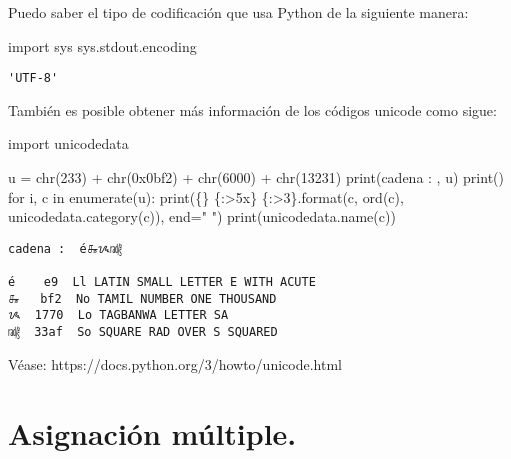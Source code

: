 \documentclass[
  letterpaper,
  DIV=11,
  numbers=noendperiod]{scrreprt}
\newenvironment{Shaded}{\begin{snugshade}}{\end{snugshade}}
\newcommand{\BaseNTok}[1]{\textcolor[rgb]{0.68,0.00,0.00}{#1}}
\newcommand{\BuiltInTok}[1]{\textcolor[rgb]{0.00,0.23,0.31}{#1}}
\newcommand{\ControlFlowTok}[1]{\textcolor[rgb]{0.00,0.23,0.31}{#1}}
\newcommand{\DecValTok}[1]{\textcolor[rgb]{0.68,0.00,0.00}{#1}}
\newcommand{\ImportTok}[1]{\textcolor[rgb]{0.00,0.46,0.62}{#1}}
\newcommand{\KeywordTok}[1]{\textcolor[rgb]{0.00,0.23,0.31}{#1}}
\newcommand{\NormalTok}[1]{\textcolor[rgb]{0.00,0.23,0.31}{#1}}
\newcommand{\OperatorTok}[1]{\textcolor[rgb]{0.37,0.37,0.37}{#1}}
\newcommand{\SpecialCharTok}[1]{\textcolor[rgb]{0.37,0.37,0.37}{#1}}
\newcommand{\StringTok}[1]{\textcolor[rgb]{0.13,0.47,0.30}{#1}}
\begin{document}
Puedo saber el tipo de codificación que usa Python de la siguiente
manera:

\begin{Shaded}
\begin{Highlighting}[]
\ImportTok{import}\NormalTok{ sys}
\NormalTok{sys.stdout.encoding}
\end{Highlighting}
\end{Shaded}

\begin{verbatim}
'UTF-8'
\end{verbatim}

También es posible obtener más información de los códigos unicode como
sigue:

\begin{Shaded}
\begin{Highlighting}[]
\ImportTok{import}\NormalTok{ unicodedata}

\NormalTok{u }\OperatorTok{=} \BuiltInTok{chr}\NormalTok{(}\DecValTok{233}\NormalTok{) }\OperatorTok{+} \BuiltInTok{chr}\NormalTok{(}\BaseNTok{0x0bf2}\NormalTok{) }\OperatorTok{+} \BuiltInTok{chr}\NormalTok{(}\DecValTok{6000}\NormalTok{) }\OperatorTok{+} \BuiltInTok{chr}\NormalTok{(}\DecValTok{13231}\NormalTok{) }
\BuiltInTok{print}\NormalTok{(}\StringTok{\textquotesingle{}cadena : \textquotesingle{}}\NormalTok{, u)}
\BuiltInTok{print}\NormalTok{()}
\ControlFlowTok{for}\NormalTok{ i, c }\KeywordTok{in} \BuiltInTok{enumerate}\NormalTok{(u):}
    \BuiltInTok{print}\NormalTok{(}\StringTok{\textquotesingle{}}\SpecialCharTok{\{\}}\StringTok{ }\SpecialCharTok{\{:\textgreater{}5x\}}\StringTok{ }\SpecialCharTok{\{:\textgreater{}3\}}\StringTok{\textquotesingle{}}\NormalTok{.}\BuiltInTok{format}\NormalTok{(c, }\BuiltInTok{ord}\NormalTok{(c), unicodedata.category(c)), end}\OperatorTok{=}\StringTok{" "}\NormalTok{)}
    \BuiltInTok{print}\NormalTok{(unicodedata.name(c))}
\end{Highlighting}
\end{Shaded}

\begin{verbatim}
cadena :  é௲ᝰ㎯

é    e9  Ll LATIN SMALL LETTER E WITH ACUTE
௲   bf2  No TAMIL NUMBER ONE THOUSAND
ᝰ  1770  Lo TAGBANWA LETTER SA
㎯  33af  So SQUARE RAD OVER S SQUARED
\end{verbatim}

Véase: https://docs.python.org/3/howto/unicode.html

\section{Asignación múltiple.}\label{asignaciuxf3n-muxfaltiple.}
\end{document}
